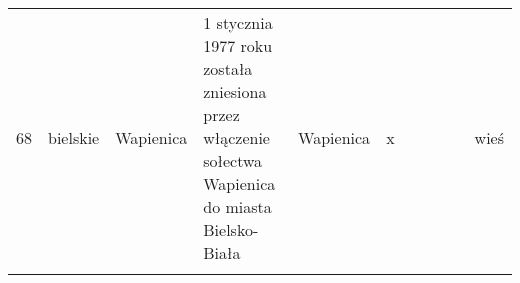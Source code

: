 \begin{table}[]
\begin{tabular}{lllllllllll}
68  & bielskie    & Wapienica     & 1 stycznia 1977 roku została zniesiona przez włączenie sołectwa Wapienica do miasta Bielsko-Biała                                                                                                              & Wapienica                      & x                     &                       &                       &                       &                       & wieś   \\                                                                                                                                                                                                           &                                &                       &                       &                       &                       &                       &       
\end{tabular}
\end{table}